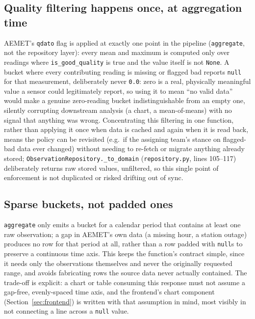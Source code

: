 \documentclass[11pt,a4paper]{article}
\begin{document}
\subsection{Quality filtering happens once, at aggregation time}

AEMET's \texttt{qdato} flag is applied at exactly one point in the pipeline
(\texttt{aggregate}, not the repository layer): every mean and maximum is
computed only over readings where \texttt{is\_good\_quality} is true and
the value itself is not \texttt{None}. A bucket where every contributing
reading is missing or flagged bad reports \texttt{null} for that
measurement, deliberately never \texttt{0.0}: zero is a real, physically
meaningful value a sensor could legitimately report, so using it to mean
``no valid data'' would make a genuine zero-reading bucket
indistinguishable from an empty one, silently corrupting downstream
analysis (a chart, a mean-of-means) with no signal that anything was
wrong. Concentrating this filtering in one function, rather than applying
it once when data is cached and again when it is read back, means the
policy can be revisited (e.g.\ if the assigning team's stance on
flagged-bad data ever changed) without needing to re-fetch or migrate
anything already stored; \texttt{ObservationRepository.\_to\_domain}
(\texttt{repository.py}, lines 105--117) deliberately returns raw stored
values, unfiltered, so this single point of enforcement is not
duplicated or risked drifting out of sync.

\subsection{Sparse buckets, not padded ones}

\texttt{aggregate} only emits a bucket for a calendar period that contains
at least one raw observation; a gap in AEMET's own data (a missing hour, a
station outage) produces no row for that period at all, rather than a row
padded with \texttt{null}s to preserve a continuous time axis. This keeps
the function's contract simple, since it needs only the observations
themselves and never the originally requested range, and avoids
fabricating rows the source data never actually contained. The trade-off is
explicit: a chart or table consuming this response must not assume a
gap-free, evenly-spaced time axis, and the frontend's chart component
(Section~\ref{sec:frontend}) is written with that assumption in mind, most
visibly in not connecting a line across a \texttt{null} value.
\end{document}
